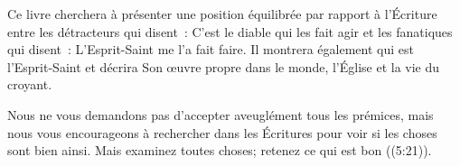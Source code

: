 Ce livre cherchera à présenter une position équilibrée par rapport à l'Écriture
 entre les détracteurs qui disent~: \og C'est le diable qui les fait agir \fg{}
 et les fanatiques qui disent~: \og L'Esprit-Saint me l'a fait faire. \fg{}
 Il montrera également qui est l'Esprit-Saint et décrira Son œuvre propre dans
 le monde, l'Église et la vie du croyant.

Nous ne vous demandons pas d'accepter aveuglément tous les prémices, mais nous
 vous encourageons à rechercher dans les Écritures pour voir si les choses sont
 bien ainsi. \og Mais examinez toutes choses; retenez ce qui est bon \fg{}
 ((5:21)).


